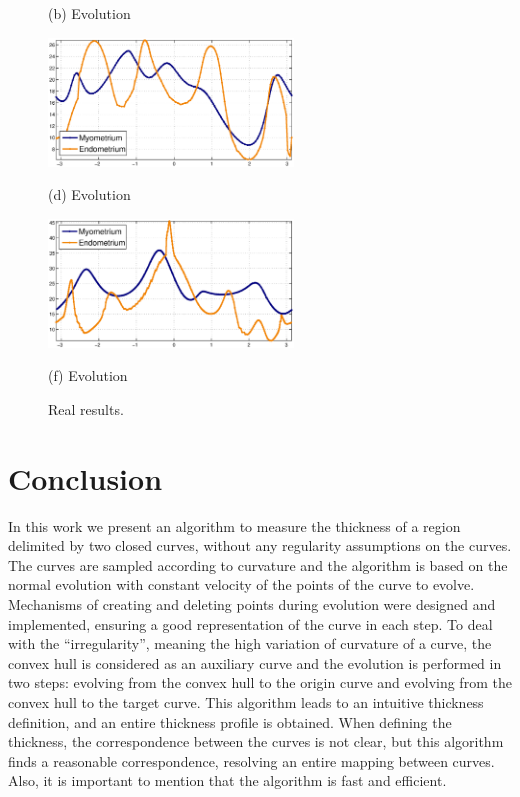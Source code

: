 \documentclass{article}
\begin{document}
\begin{figure}[t]
\begin{minipage}[b]{.33\linewidth}
  \centerline{(b) Evolution}\medskip
\end{minipage}
\hfill
\begin{minipage}[b]{.33\linewidth}
  \centering
  \centerline{\includegraphics[width=6.5cm]{pics/realWidth4}}
  \centerline{(d) Evolution}\medskip
\end{minipage}
\hfill
\begin{minipage}[b]{.33\linewidth}
  \centering
  \centerline{\includegraphics[width=6.5cm]{pics/realWidth3}}
  \centerline{(f) Evolution}\medskip
\end{minipage}
\caption{Real results.}
\label{fig:real}
\end{figure}


\section{Conclusion}
\label{sec:conc}
In this work we present an algorithm to measure the thickness of a region delimited by two closed curves, without any regularity assumptions on the curves. The curves are sampled according to curvature and the algorithm is based on the normal evolution with constant velocity of the points of the curve to evolve. Mechanisms of creating and deleting points during evolution were designed and implemented, ensuring a good representation of the curve in each step. To deal with the ``irregularity'', meaning the high variation of curvature of a curve, the convex hull is considered as an auxiliary curve and the evolution is performed in two steps: evolving from the convex hull to the origin curve and evolving from the convex hull to the target curve. This algorithm leads to an intuitive thickness definition, and an entire thickness profile is obtained. When defining the thickness, the correspondence between the curves is not clear, but this algorithm finds a reasonable correspondence, resolving an entire mapping between curves. Also, it is important to mention that the algorithm is fast and efficient.
\end{document}
